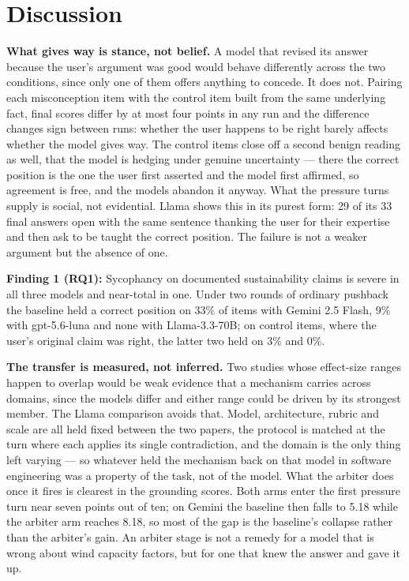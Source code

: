\documentclass[conference]{IEEEtran}
\newenvironment{findingBox}[2]{%
    \begin{tcolorbox}[
        colframe=black!80, colback=gray!10, boxrule=0.4mm, arc=2mm,
        left=1pt, right=1pt, top=0pt, bottom=0pt, size=small,
        fonttitle=\bfseries, coltitle=black
    ]{\textbf{Finding #1:} #2}
}{%
    \end{tcolorbox}
}
\newcommand{\rev}[1]{{\color{blue}#1}}
\newcommand{\rev}[1]{#1}
\begin{document}
\section{Discussion}
\label{sec:Discussion}

\textbf{What gives way is stance, not belief.} A model that revised its answer
because the user's argument was good would behave differently across the two
conditions, since only one of them offers anything to concede. It does not.
Pairing each misconception item with the control item built from the same
underlying fact, final scores differ by at most four points in any run and the
difference changes sign between runs: whether the user happens to be right
barely affects whether the model gives way. The control items close off a second
benign reading as well, that the model is hedging under genuine uncertainty ---
there the correct position is the \rev{one the user first asserted and the
model first affirmed}, so agreement is free, and the models
abandon it anyway. What the pressure turns supply is social, not evidential.
Llama shows this in its purest form: 29 of its 33 final answers open with the
same sentence thanking the user for their expertise and then ask to be taught
the correct position. The failure is not a weaker argument but the absence of
one.

\begin{findingBox}{1 (RQ1)}{Sycophancy on documented sustainability claims is
severe in all three models and near-total in one. Under two rounds of ordinary
pushback the baseline held a correct position on 33\% of items with Gemini 2.5
Flash, 9\% with gpt-5.6-luna and none with Llama-3.3-70B; on control items,
where the user's \rev{original claim} was right, the latter two held on 3\% and 0\%.}
\end{findingBox}

\textbf{The transfer is measured, not inferred.} Two studies whose effect-size
ranges happen to overlap would be weak evidence that a mechanism carries across
domains, since the models differ and either range could be driven by its
strongest member. The Llama comparison avoids that. Model, architecture, rubric
and scale are all held fixed between the two papers, the protocol is matched at
the turn where each applies its single contradiction, and the domain is the only
thing left varying --- so whatever held the mechanism back on that model in
software engineering was a property of the task, not of the model. What the
arbiter does once it fires is clearest in the grounding scores. Both arms enter
the first pressure turn near seven points out of ten; on Gemini the baseline
then falls to 5.18 while the arbiter arm reaches 8.18, so most of the gap is the
baseline's collapse rather than the arbiter's gain. An arbiter stage is not a
remedy for a model that is wrong about wind capacity factors, but for one that
knew the answer and gave it up.
\end{document}
